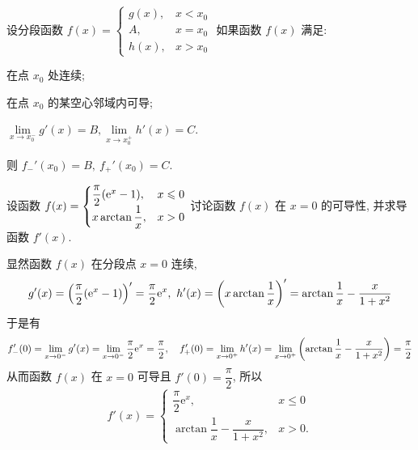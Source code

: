 \begin{theorem}
    设分段函数 $f(x)=\begin{cases}
            g(x) ,& x<x_0 \\A,&x=x_0\\h(x),&x>x_0
        \end{cases}$ 如果函数 $f(x)$ 满足:
    \begin{enumerate*}[label=(\arabic{*})]
        \item 在点 $x_0$ 处连续;
        \item 在点 $x_0$ 的某空心邻域内可导;
        \item $\lim\limits_{x\to x_0^-}g'(x)=B,\lim\limits_{x\to x_0^+}h'(x)=C$.
    \end{enumerate*}
    则 $f_{-}'(x_0)=B,~f_{+}'(x_0)=C.$
\end{theorem}

\begin{example}
    设函数 $f(x)=\begin{cases}
            \dfrac{\pi}{2}\qty(\mathrm{e}^x-1) ,&x\leqslant 0 \\ x\arctan\dfrac{1}{x},&x>0
        \end{cases}$
    讨论函数 $f(x)$ 在 $x=0$ 的可导性, 并求导函数 $f'(x)$.
\end{example}
\begin{solution}
    显然函数 $f(x)$ 在分段点 $x=0$ 连续, $$g'(x)=\qty(\dfrac{\pi}{2}\qty(\mathrm{e}^x-1))'=\dfrac{\pi}{2}\mathrm{e}^x,~h'(x)=\qty(x\arctan\dfrac{1}{x})'=\arctan\dfrac{1}{x}-\dfrac{x}{1+x^2}$$
    于是有 $$\displaystyle f_-'(0)=\lim_{x\to0^-}g'(x)=\lim_{x\to0^-}\dfrac{\pi}{2}\mathrm{e}^x=\dfrac{\pi}{2},\quad f_+'(0)=\lim_{x\to0^+}h'(x)=\lim_{x\to0^+}\qty(\arctan\dfrac{1}{x}-\dfrac{x}{1+x^2})=\dfrac{\pi}{2}$$ 
    从而函数 $f(x)$ 在 $x=0$ 可导且 $f'(0)=\dfrac{\pi}{2}$, 所以 $$f'(x)=\begin{cases}
            \dfrac{\pi}{2}\mathrm{e}^x ,&x\leqslant 0 \\ \arctan\dfrac{1}{x}-\dfrac{x}{1+x^2},&x>0.
        \end{cases}$$
\end{solution}